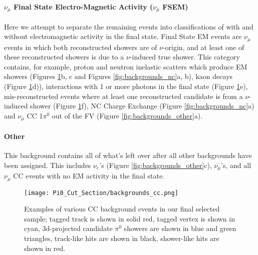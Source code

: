 \paragraph{ $\nu_\mu$ Final State Electro-Magnetic Activity ($\nu_\mu$ FSEM)}
Here we attempt to separate the remaining events into classifications of with and without electromagnetic activity in the final state.  Final State EM events are $\nu_\mu$ events in which both reconstructed showers are of $\nu$-origin, and at least one of these reconstructed showers is due to a $\nu$-induced true shower. This category contains, for example, proton and neutron inelastic scatters which produce EM showers (Figures \ref{fig:backgrounds_cc}b, c and Figures \ref{fig:backgrounds_nc}a, b), kaon decays (Figure \ref{fig:backgrounds_cc}d)),  interactions with 1 or more photons in the final state (Figure \ref{fig:backgrounds_cc}e), mis-reconstructed events where at least one reconstructed candidate is from a $\nu$-induced shower (Figure \ref{fig:backgrounds_cc}f), NC Charge Exchange (Figure \ref{fig:backgrounds_nc}a) and $\nu_\mu$ CC 1$\pi^0$ out of the FV (Figure \ref{fig:backgrounds_other}a).

\paragraph{Other}
This background contains all of what's left over after all other backgrounds have been assigned.  This includes $\nu_e$'s (Figure \ref{fig:backgrounds_other}c), $\overline{\nu_\mu}$'s, and all $\nu_\mu$ CC events with no EM activity in the final state.



\begin{figure}[h!]
\centering
\texttt{[image: Pi0\_Cut\_Section/backgrounds\_cc.png]}
\caption{ Examples of various CC background events in our final selected sample; tagged track is shown in solid red, tagged vertex is shown in cyan, 3d-projected candidate $\pi^0$ showers are shown in blue and green triangles, track-like hits are shown in black, shower-like hits are shown in red. }
\label{fig:backgrounds_cc}
\end{figure}

